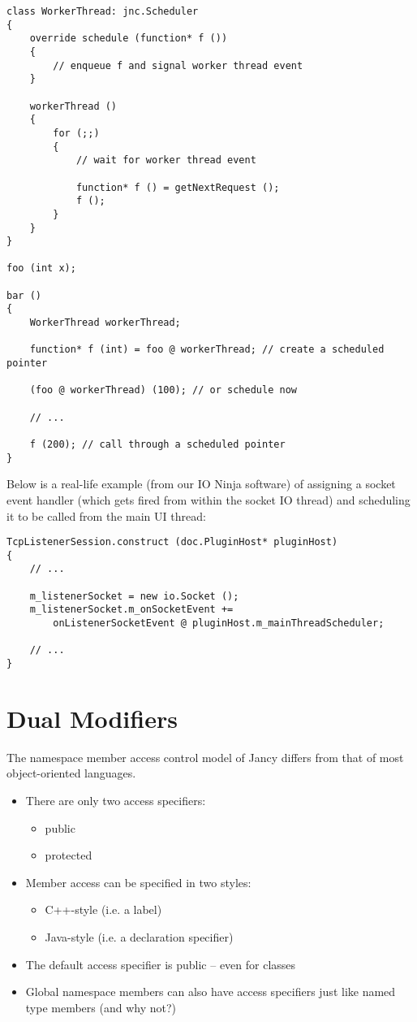 \documentclass[oneside]{book}
\begin{document}
\begin{lstlisting}
class WorkerThread: jnc.Scheduler
{
    override schedule (function* f ())
    {
        // enqueue f and signal worker thread event
    }

    workerThread ()
    {
        for (;;)
        {
            // wait for worker thread event

            function* f () = getNextRequest ();
            f ();
        }
    }
}

foo (int x);

bar ()
{
    WorkerThread workerThread;

    function* f (int) = foo @ workerThread; // create a scheduled pointer

    (foo @ workerThread) (100); // or schedule now

    // ...

    f (200); // call through a scheduled pointer
}
\end{lstlisting}

Below is a real-life example (from our IO Ninja software) of assigning a socket event handler (which gets fired from within the socket IO thread) and scheduling it to be called from the main UI thread:

\begin{lstlisting}
TcpListenerSession.construct (doc.PluginHost* pluginHost)
{
    // ...

    m_listenerSocket = new io.Socket ();
    m_listenerSocket.m_onSocketEvent += 
        onListenerSocketEvent @ pluginHost.m_mainThreadScheduler;

    // ...
}
\end{lstlisting}

\section{Dual Modifiers}

The namespace member access control model of Jancy differs from that of most object-oriented languages.

\begin{itemize}
\item There are only two access specifiers:
	\begin{itemize}
	\item public
	\item protected
	\end{itemize}
\item Member access can be specified in two styles:
	\begin{itemize}
	\item C++-style (i.e. a label)
	\item Java-style (i.e. a declaration specifier)
	\end{itemize}
\item The default access specifier is public -- even for classes
\item Global namespace members can also have access specifiers just like named type members (and why not?)
\end{itemize}
\end{document}
